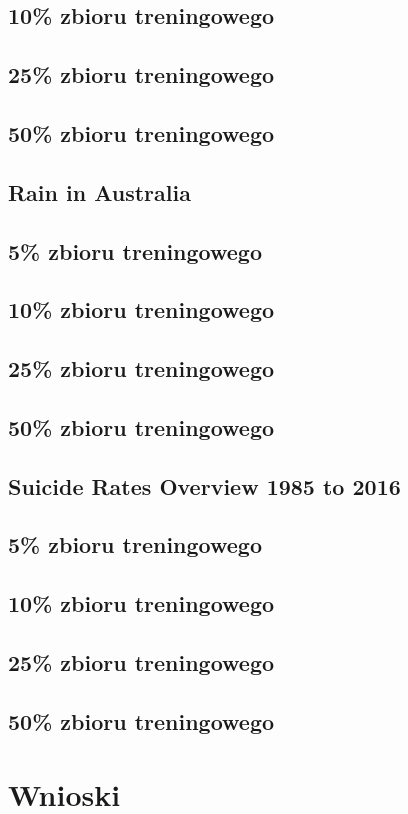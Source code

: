 \documentclass[a4paper,11pt]{article}
\begin{document}
\subsection*{10\% zbioru treningowego}
\subsection*{25\% zbioru treningowego}
\subsection*{50\% zbioru treningowego}

\subsection{Rain in Australia}
\subsection*{5\% zbioru treningowego}
\subsection*{10\% zbioru treningowego}
\subsection*{25\% zbioru treningowego}
\subsection*{50\% zbioru treningowego}

\subsection{Suicide Rates Overview 1985 to 2016} 
\subsection*{5\% zbioru treningowego}
\subsection*{10\% zbioru treningowego}
\subsection*{25\% zbioru treningowego}
\subsection*{50\% zbioru treningowego}

\section{Wnioski}
\end{document}
